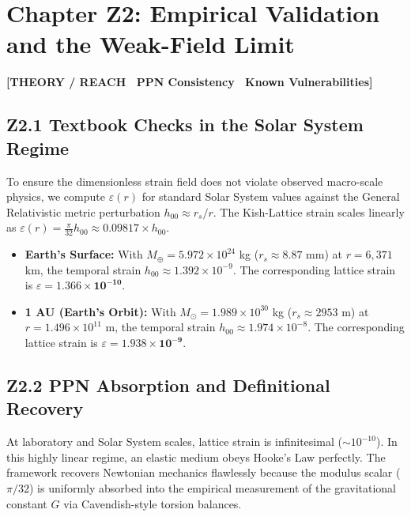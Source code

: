 \documentclass[11pt, letterpaper, openany]{book}
\begin{document}
\vspace{1cm}
\section*{Chapter Z2: Empirical Validation and the Weak-Field Limit}

\begin{center}
{\color{theorytag}\textbf{[THEORY / REACH \textbullet\ PPN Consistency \textbullet\ Known Vulnerabilities]}}
\end{center}

\subsection*{Z2.1 Textbook Checks in the Solar System Regime}

To ensure the dimensionless strain field does not violate observed macro-scale physics, we compute $\varepsilon(r)$ for standard Solar System values against the General Relativistic metric perturbation $h_{00} \approx r_s/r$. The Kish-Lattice strain scales linearly as $\varepsilon(r) = \frac{\pi}{32} h_{00} \approx 0.09817 \times h_{00}$.

\begin{itemize}
    \item \textbf{Earth's Surface:} With $M_{\oplus} = 5.972 \times 10^{24}$ kg ($r_s \approx 8.87$ mm) at $r = 6,371$ km, the temporal strain $h_{00} \approx 1.392 \times 10^{-9}$. The corresponding lattice strain is $\varepsilon = \mathbf{1.366 \times 10^{-10}}$.
    \item \textbf{1 AU (Earth's Orbit):} With $M_{\odot} = 1.989 \times 10^{30}$ kg ($r_s \approx 2953$ m) at $r = 1.496 \times 10^{11}$ m, the temporal strain $h_{00} \approx 1.974 \times 10^{-8}$. The corresponding lattice strain is $\varepsilon = \mathbf{1.938 \times 10^{-9}}$.
\end{itemize}

\subsection*{Z2.2 PPN Absorption and Definitional Recovery}

At laboratory and Solar System scales, lattice strain is infinitesimal ($\sim 10^{-10}$). In this highly linear regime, an elastic medium obeys Hooke's Law perfectly. The framework recovers Newtonian mechanics flawlessly because the modulus scalar ($\pi/32$) is uniformly absorbed into the empirical measurement of the gravitational constant $G$ via Cavendish-style torsion balances.
\end{document}
